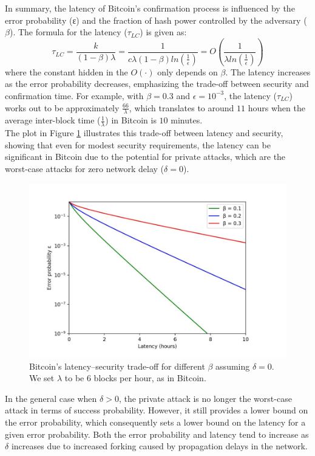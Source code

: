 In summary, the latency of Bitcoin's confirmation process is influenced by the error probability (ε) and the fraction of hash power controlled by the adversary ($\beta$). The formula for the latency ($\tau_{LC}$) is given as:
\begin{equation*}
	\tau_{LC} = \frac{k}{(1 - \beta)\lambda } = \frac{1}{c \lambda (1 - \beta) ln(\frac{1}{\epsilon})} = O(\frac{1}{\lambda ln(\frac{1}{\epsilon})})
\end{equation*}
where the constant hidden in the $O(·)$ only depends on $\beta$. The latency increases as the error probability decreases, emphasizing the trade-off between security and confirmation time.
For example, with $\beta = 0.3$ and $\epsilon = 10^{-3}$, the latency ($\tau_{LC}$) works out to be approximately $\frac{66}{\lambda}$, which translates to around $11$ hours when the average inter-block time ($\frac{1}{\lambda}$) in Bitcoin is $10$ minutes.\\
The plot in Figure \ref{fig:L9_f1} illustrates this trade-off between latency and security, showing that even for modest security requirements, the latency can be significant in Bitcoin due to the potential for private attacks, which are the worst-case attacks for zero network delay ($\delta = 0$).
\begin{center}
	\begin{figure}
		\centering
		\includegraphics[width=0.8\linewidth]{Fig/09/F1}
		\caption{Bitcoin’s latency–security trade-oﬀ for different $\beta$ assuming $\delta = 0$. We set $\lambda$ to be $6$ blocks per hour, as in Bitcoin.}
		\label{fig:L9_f1}
	\end{figure}
\end{center}
In the general case when $\delta > 0$, the private attack is no longer the worst-case attack in terms of success probability. However, it still provides a lower bound on the error probability, which consequently sets a lower bound on the latency for a given error probability. Both the error probability and latency tend to increase as $\delta$ increases due to increased forking caused by propagation delays in the network.\\
